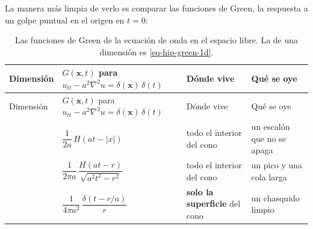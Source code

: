\documentclass[
  spanish,
  a4paper,
]{scrbook}
\theoremstyle{definition}
\theoremstyle{plain}
\theoremstyle{definition}
\theoremstyle{plain}
\theoremstyle{definition}
\theoremstyle{remark}
\begin{document}
La manera más limpia de verlo es comparar las funciones de Green, la
respuesta a un golpe puntual en el origen en \(t=0\):

\begin{longtable}[]{@{}
  >{\centering\arraybackslash}p{}
  >{\raggedright\arraybackslash}p{}
  >{\raggedright\arraybackslash}p{}
  >{\raggedright\arraybackslash}p{}@{}}
\caption{Las funciones de Green de la ecuación de onda en el espacio
libre. La de una dimensión es
\ref{eq-hip-green-1d}.}\label{tbl-hip-green-dimensiones}\tabularnewline
\toprule\noalign{}
\begin{minipage}[b]{\linewidth}\centering
Dimensión
\end{minipage} & \begin{minipage}[b]{\linewidth}\raggedright
\(G(\mathbf x, t)\) para
\(u_{tt} - a^2\nabla^2u = \delta(\mathbf x)\,\delta(t)\)
\end{minipage} & \begin{minipage}[b]{\linewidth}\raggedright
Dónde vive
\end{minipage} & \begin{minipage}[b]{\linewidth}\raggedright
Qué se oye
\end{minipage} \\
\midrule\noalign{}
\endfirsthead
\toprule\noalign{}
\begin{minipage}[b]{\linewidth}\centering
Dimensión
\end{minipage} & \begin{minipage}[b]{\linewidth}\raggedright
\(G(\mathbf x, t)\) para
\(u_{tt} - a^2\nabla^2u = \delta(\mathbf x)\,\delta(t)\)
\end{minipage} & \begin{minipage}[b]{\linewidth}\raggedright
Dónde vive
\end{minipage} & \begin{minipage}[b]{\linewidth}\raggedright
Qué se oye
\end{minipage} \\
\midrule\noalign{}
\endhead
\bottomrule\noalign{}
\endlastfoot
1 & \(\dfrac{1}{2a}\,H(at - |x|)\) & todo el interior del cono & un
escalón que no se apaga \\
2 & \(\dfrac{1}{2\pi a}\,\dfrac{H(at-r)}{\sqrt{a^2t^2-r^2}}\) & todo el
interior del cono & un pico y una cola larga \\
3 & \(\dfrac{1}{4\pi a^2}\,\dfrac{\delta(t - r/a)}{r}\) & \textbf{solo
la superficie} del cono & un chasquido limpio \\
\end{longtable}
\end{document}
